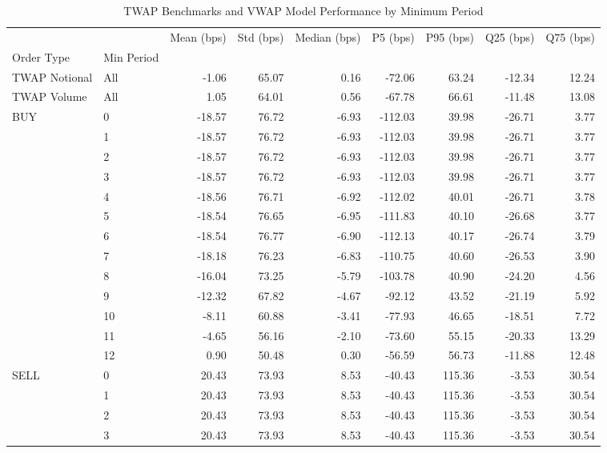 \begin{table}
\caption{TWAP Benchmarks and VWAP Model Performance by Minimum Period}
\label{tab:comprehensive_performance}
\begin{tabular}{l|l|rrrrrrr}
\toprule
 &  & Mean (bps) & Std (bps) & Median (bps) & P5 (bps) & P95 (bps) & Q25 (bps) & Q75 (bps) \\
Order Type & Min Period &  &  &  &  &  &  &  \\
\midrule
TWAP Notional & All & -1.06 & 65.07 & 0.16 & -72.06 & 63.24 & -12.34 & 12.24 \\
\cline{1-9}
TWAP Volume & All & 1.05 & 64.01 & 0.56 & -67.78 & 66.61 & -11.48 & 13.08 \\
\cline{1-9}
\multirow[t]{13}{*}{BUY} & 0 & -18.57 & 76.72 & -6.93 & -112.03 & 39.98 & -26.71 & 3.77 \\
 & 1 & -18.57 & 76.72 & -6.93 & -112.03 & 39.98 & -26.71 & 3.77 \\
 & 2 & -18.57 & 76.72 & -6.93 & -112.03 & 39.98 & -26.71 & 3.77 \\
 & 3 & -18.57 & 76.72 & -6.93 & -112.03 & 39.98 & -26.71 & 3.77 \\
 & 4 & -18.56 & 76.71 & -6.92 & -112.02 & 40.01 & -26.71 & 3.78 \\
 & 5 & -18.54 & 76.65 & -6.95 & -111.83 & 40.10 & -26.68 & 3.77 \\
 & 6 & -18.54 & 76.77 & -6.90 & -112.13 & 40.17 & -26.74 & 3.79 \\
 & 7 & -18.18 & 76.23 & -6.83 & -110.75 & 40.60 & -26.53 & 3.90 \\
 & 8 & -16.04 & 73.25 & -5.79 & -103.78 & 40.90 & -24.20 & 4.56 \\
 & 9 & -12.32 & 67.82 & -4.67 & -92.12 & 43.52 & -21.19 & 5.92 \\
 & 10 & -8.11 & 60.88 & -3.41 & -77.93 & 46.65 & -18.51 & 7.72 \\
 & 11 & -4.65 & 56.16 & -2.10 & -73.60 & 55.15 & -20.33 & 13.29 \\
 & 12 & 0.90 & 50.48 & 0.30 & -56.59 & 56.73 & -11.88 & 12.48 \\
\cline{1-9}
\multirow[t]{13}{*}{SELL} & 0 & 20.43 & 73.93 & 8.53 & -40.43 & 115.36 & -3.53 & 30.54 \\
 & 1 & 20.43 & 73.93 & 8.53 & -40.43 & 115.36 & -3.53 & 30.54 \\
 & 2 & 20.43 & 73.93 & 8.53 & -40.43 & 115.36 & -3.53 & 30.54 \\
 & 3 & 20.43 & 73.93 & 8.53 & -40.43 & 115.36 & -3.53 & 30.54 \\

\end{tabular}
\end{table}
